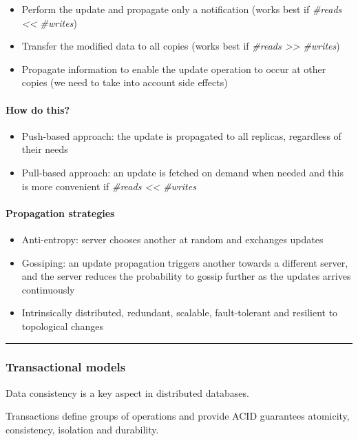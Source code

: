 \begin{itemize}
\itemsep1pt\parskip0pt
\item
  Perform the update and propagate only a notification (works best if
  \emph{\#reads \textless{}\textless{} \#writes})
\item
  Transfer the modified data to all copies (works best if \emph{\#reads
  \textgreater{}\textgreater{} \#writes})
\item
  Propagate information to enable the update operation to occur at other
  copies (we need to take into account side effects)
\end{itemize}

\paragraph{How do this?}\label{how-do-this}

\begin{itemize}
\itemsep1pt\parskip0pt
\item
  Push-based approach: the update is propagated to all replicas,
  regardless of their needs
\item
  Pull-based approach: an update is fetched on demand when needed and
  this is more convenient if \emph{\#reads \textless{}\textless{}
  \#writes}
\end{itemize}

\paragraph{Propagation strategies}\label{propagation-strategies}

\begin{itemize}
\itemsep1pt\parskip0pt
\item
  Anti-entropy: server chooses another at random and exchanges updates
\item
  Gossiping: an update propagation triggers another towards a different
  server, and the server reduces the probability to gossip further as
  the updates arrives continuously
\item
  Intrinsically distributed, redundant, scalable, fault-tolerant and
  resilient to topological changes
\end{itemize}

\begin{center}\rule{3in}{0.4pt}\end{center}

\subsubsection{Transactional models}\label{transactional-models}

Data consistency is a key aspect in distributed databases.

Transactions define groups of operations and provide ACID guarantees
atomicity, consistency, isolation and durability.
